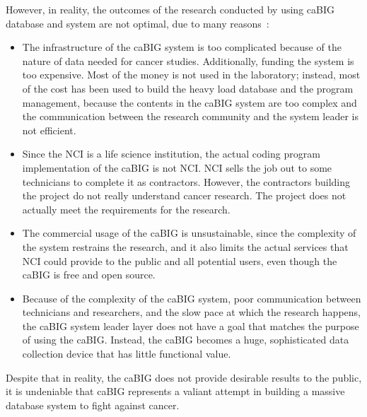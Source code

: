 However, in reality, the outcomes of the research conducted by 
using caBIG 
database and system are not optimal, due to many 
reasons~\cite{Califano}:
\begin{itemize}
	\item The infrastructure of the caBIG system is too complicated because 
	of the nature of data needed for cancer studies. Additionally, 
	funding the system 
	is too expensive. Most of the money is not used in the laboratory; 
	instead, most of the cost has been used to build the heavy 
	load database and the 
	program management, because the contents in the caBIG system are too
	complex and the communication between the research community and the 
	system leader is not efficient.
	\item Since the NCI is a life science institution, the actual coding program 
	implementation of the caBIG is not NCI. NCI sells the job out to some 
	technicians to complete it as contractors. However, the contractors 
	building the project do not really understand cancer research. The project 
	does not actually meet the requirements for the research.
	\item The commercial usage of the caBIG is unsustainable, since the 
	complexity of the system restrains the research, and it also limits the 
	actual services that NCI could provide to the public and all potential 
	users, even though the caBIG is free and open source.
	\item Because of the complexity of the caBIG system, poor 
	communication between technicians and researchers, and the 
	slow pace at which the research happens, 
	the caBIG system leader layer does not have a goal that matches 
	the purpose of using the caBIG. 
	Instead, the caBIG becomes a huge, sophisticated data collection device
	that has little functional value.
\end{itemize}
Despite that in reality, the caBIG does not provide desirable results to the 
public, it is undeniable that caBIG represents a valiant attempt in 
building a massive database system to fight against cancer. 

